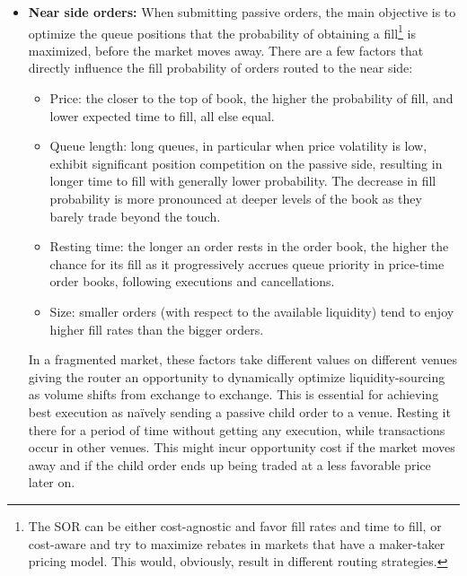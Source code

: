 \begin{itemize}
\item \textbf{Near side orders:} When submitting passive orders, the main objective is to optimize the queue positions that the probability of obtaining a fill\footnote{The SOR can be either cost-agnostic and favor fill rates and time to fill, or cost-aware and try to maximize rebates in markets that have a maker-taker pricing model. This would, obviously, result in different routing strategies.} is maximized, before the market moves away. There are a few factors that directly influence the fill probability of orders routed to the near side:


\begin{itemize}
\item Price: the closer to the top of book, the higher the probability of fill, and lower expected time to fill, all else equal.

\item Queue length: long queues, in particular when price volatility is low, exhibit significant position competition on the passive side, resulting in longer time to fill with generally lower probability. The decrease in fill probability is more pronounced at deeper levels of the book as they barely trade beyond the touch. 

\item Resting time: the longer an order rests in the order book, the higher the chance for its fill as it progressively accrues queue priority in price-time order books, following executions and cancellations.

\item Size: smaller orders (with respect to the available liquidity) tend to enjoy higher fill rates than the bigger orders.
\end{itemize}


In a fragmented market, these factors take different values on different venues giving the router an opportunity to dynamically optimize liquidity-sourcing as volume shifts from exchange to exchange. This is essential for achieving best execution as na\"ively  sending a passive child order to a venue. Resting it there for a period of time without getting any execution, while transactions occur in other venues. This might incur opportunity cost if the market moves away and if the child order ends up being traded at a less favorable price later on. \twomedskip



\end{itemize}
